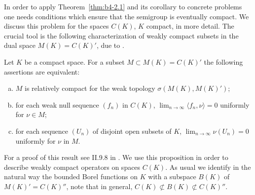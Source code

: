 In order to apply Theorem~\ref{thm:b4-2.1} and its corollary to concrete problems one
needs conditions which ensure that the semigroup is eventually compact.
We discuss this problem for the spaces $C(K)$, $K$ compact, in
more detail.
The crucial tool is the following characterization of
weakly compact subsets in the dual space $M(K) = C(K)'$, due to
\citet{grothendieck:1953}.

\begin{proposition}\label{prop:b4-2.3}
	Let $K$ be a compact space.
	For a subset $M \subset M(K) = C(K)'$ the following assertions are equivalent:
	
	\begin{enumerate}[(a)]
		\item 
		$M$ is relatively compact for the weak topology $\sigma(M(K),M(K)')$;
	
		\item 
		for each weak null sequence $(f_n)$ in $C(K)$, $\lim_{n\to\infty}\langle f_n,\nu \rangle = 0$ uniformly for $\nu \in M$;
	
		\item 
		for each sequence $(U_n)$ of disjoint open subsets of $K$, 
		$\lim_{n\to\infty}\nu(U_n) = 0$ uniformly for $\nu$ in $M$.
		\end{enumerate}
\end{proposition}
For a proof of this result see \eg II.9.8 in \citet{schaefer:1974}.
We use this proposition in order to describe weakly compact operators on spaces $C(K)$.
As usual we identify in the natural way the bounded
Borel functions on $K$ with a subspace $B(K)$ of $M(K)' = C(K)''$, note that in
general, $C(K) \not\subset B(K) \not\subset C(K)''$.

